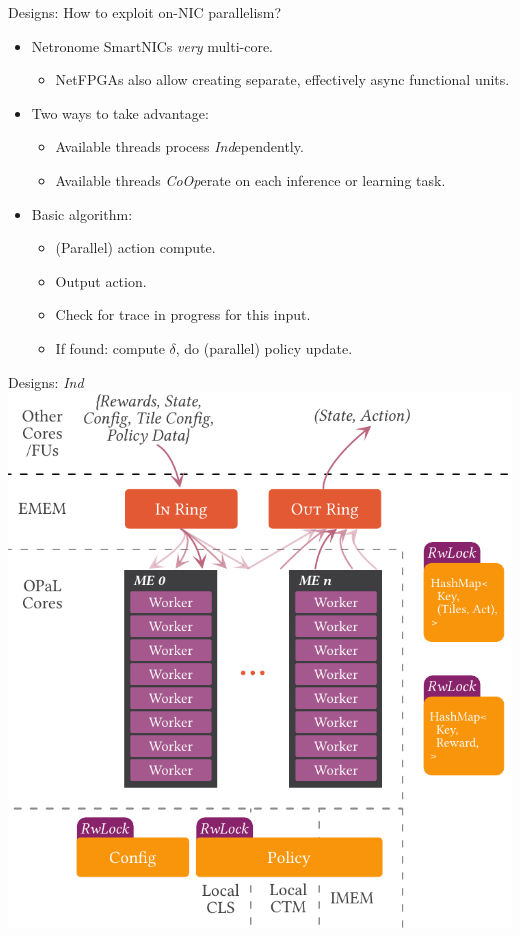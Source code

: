 \documentclass[aspectratio=169,xcolor={dvipsnames}
]{beamer}
\newcommand{\Coopfw}{\emph{CoOp}}
\newcommand{\Indfw}{\emph{Ind}}
\begin{document}
\begin{frame}{Designs: How to exploit on-NIC parallelism?}
	\begin{itemize}[<+->]
		\item Netronome SmartNICs \emph{very} multi-core.
		\begin{itemize}[<+->]
			\item NetFPGAs also allow creating separate, effectively async functional units.
		\end{itemize}
		\item Two ways to take advantage:
		\begin{itemize}[<+->]
			\item Available threads process \Indfw{}ependently.
			\item Available threads \Coopfw{}erate on each inference or learning task.
		\end{itemize}
		\item Basic algorithm:
		\begin{itemize}[<+->]
			\item (Parallel) action compute.
			\item Output action.
			\item Check for trace in progress for this input.
			\item If found: compute $\delta$, do (parallel) policy update.
		\end{itemize}
	\end{itemize}
\end{frame}

\begin{frame}{Designs: \emph{Ind}}
	\centering
	\includegraphics[width=0.52\linewidth]{../paper/figures/ind}
\end{frame}
\end{document}

